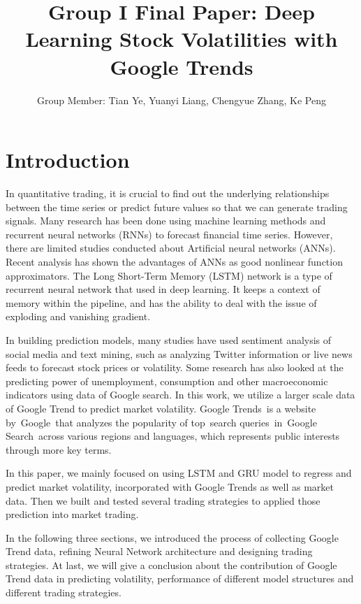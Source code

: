 \documentclass[11pt]{article}
\title{Group I Final Paper: Deep Learning Stock Volatilities with Google Trends}
\author{Group Member: Tian Ye, Yuanyi Liang, Chengyue Zhang, Ke Peng}
\begin{document}
\maketitle

\section{Introduction}

In quantitative trading, it is crucial to find out the underlying relationships between the time series or predict future values so that we can generate trading signals. Many research has been done using machine learning methods and recurrent neural networks (RNNs) to forecast financial time series. However, there are limited studies conducted about Artificial neural networks (ANNs). Recent analysis has shown the advantages of ANNs as good nonlinear function approximators. The Long Short-Term Memory (LSTM) network is a type of recurrent neural network that used in deep learning. It keeps a context of memory within the pipeline, and has the ability to deal with the issue of exploding and vanishing gradient.

\vspace{5mm}

In building prediction models, many studies have used sentiment analysis of social media and text mining, such as analyzing Twitter information or live news feeds to forecast stock prices or volatility. Some research has also looked at the predicting power of unemployment, consumption and other macroeconomic indicators using data of Google search. In this work, we utilize a larger scale data of Google Trend to predict market volatility. Google Trends is a website by Google that analyzes the popularity of top search queries in Google Search across various regions and languages, which represents public interests through more key terms. 

\vspace{5mm}

In this paper, we mainly focused on using LSTM and GRU model to regress and predict market volatility, incorporated with Google Trends as well as market data. Then we built and tested several trading strategies to applied those prediction into market trading.

\vspace{5mm}

In the following three sections, we introduced the process of collecting Google Trend data, refining Neural Network architecture and designing trading strategies. At last, we will give a conclusion about the contribution of Google Trend data in predicting volatility, performance of different model structures and different trading strategies.
\end{document}
